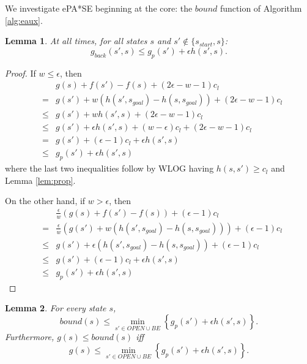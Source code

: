 \documentclass[letterpaper]{article}
\newtheorem{lemma}{Lemma}
\begin{document}
We investigate ePA*SE beginning at the core: the $bound$ function of Algorithm \ref{alg:eaux}.

\begin{lemma}
\label{lem:indep}
At all times, for all states $s$ and $s'\notin \{s_{start},s\}$:
\[g_{back}(s',s) \le g_p(s') + \epsilon h(s',s).\]
\end{lemma}

\begin{proof}
If $w \le \epsilon$, then
\begin{eqnarray*}
&&g(s) + f(s') - f(s) + (2\epsilon-w-1)c_l
\\&=& g(s') + w(h(s',s_{goal}) - h(s,s_{goal})) + (2\epsilon-w-1)c_l
\\&\le& g(s') + wh(s',s) + (2\epsilon-w-1)c_l
\\&\le& g(s') + \epsilon h(s',s) + (w-\epsilon)c_l + (2\epsilon-w-1)c_l
\\&=& g(s') + (\epsilon-1)c_l + \epsilon h(s',s)
\\&\le& g_p(s') + \epsilon h(s',s)
\end{eqnarray*}
where the last two inequalities follow by WLOG having $h(s,s') \ge c_l$ and Lemma \ref{lem:prop}.

On the other hand, if $w > \epsilon$, then
\begin{eqnarray*}
&&\frac\epsilon w\left(g(s) + f(s') - f(s)\right) + (\epsilon-1)c_l
\\&=& \frac\epsilon w\left(g(s') + w(h(s',s_{goal}) - h(s,s_{goal})) \right) + (\epsilon-1)c_l
\\&\le& g(s') + \epsilon(h(s',s_{goal}) - h(s,s_{goal})) + (\epsilon-1)c_l
\\&\le& g(s') + (\epsilon-1)c_l + \epsilon h(s',s)
\\&\le& g_p(s') + \epsilon h(s',s)
\end{eqnarray*}
\end{proof}

\begin{lemma}
\label{lem:bound}
For every state $s$,
\[bound(s) \le \min_{s'\in OPEN \cup BE} \left\{ g_p(s') + \epsilon h(s',s) \right\}.\]
Furthermore, $g(s) \le bound(s)$ iff
\[g(s) \le \min_{s'\in OPEN \cup BE} \left\{ g_p(s') + \epsilon h(s',s) \right\}.\]
\end{lemma}
\end{document}
